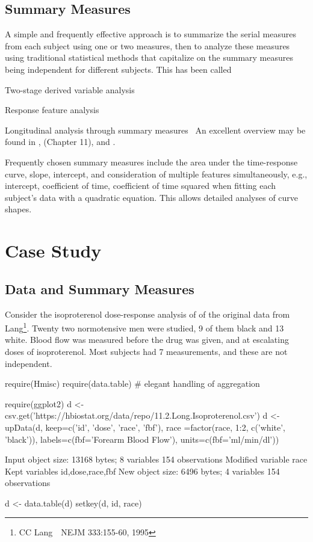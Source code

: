 \subsection{Summary Measures}\ipacue
A simple and frequently effective approach is to summarize the serial
measures from each subject using one or two measures, then to analyze
these measures using traditional statistical methods that capitalize
on the summary measures being independent for different subjects.
This has been called
\be
\item Two-stage derived variable analysis~\cite{diggle-longit}
\item Response feature analysis~\cite{dupmod}
\item Longitudinal analysis through summary measures~\cite{mat90ana}
\ee
An excellent overview may be found in \citet{mat90ana},
\citet{dupmod} (Chapter 11), and \citet{sen00rep}.

Frequently chosen summary measures include the area under the
time-response curve, slope, intercept, and consideration of multiple
features simultaneously, e.g., intercept, coefficient of time,
coefficient of time squared when fitting each subject's data with a
quadratic equation.  This allows detailed analyses of curve shapes.

\section{Case Study}
\subsection{Data and Summary Measures}\ipacue
Consider the isoproterenol dose-response analysis of \citet{dupmod} of
the original data from Lang\footnote{CC Lang~\etal\ NEJM 333:155-60, 1995}.  Twenty two normotensive men were studied, 9 of
them black and 13 white.  Blood flow was measured before the drug was
given, and at escalating doses of isoproterenol.  Most subjects had 7
measurements, and these are not independent.
\begin{Schunk}
\begin{Sinput}
require(Hmisc)
require(data.table)   # elegant handling of aggregation
\end{Sinput}
\begin{Sinput}
require(ggplot2)
d <- csv.get('https://hbiostat.org/data/repo/11.2.Long.Isoproterenol.csv')
d <- upData(d, keep=c('id', 'dose', 'race', 'fbf'),
            race  =factor(race, 1:2, c('white', 'black')),
            labels=c(fbf='Forearm Blood Flow'),
            units=c(fbf='ml/min/dl'))
\end{Sinput}
\begin{Soutput}
Input object size:	 13168 bytes;	 8 variables	 154 observations
Modified variable	race
Kept variables	id,dose,race,fbf
New object size:	6496 bytes;	4 variables	154 observations
\end{Soutput}
\begin{Sinput}
d <- data.table(d)
setkey(d, id, race)
\end{Sinput}
\end{Schunk}

